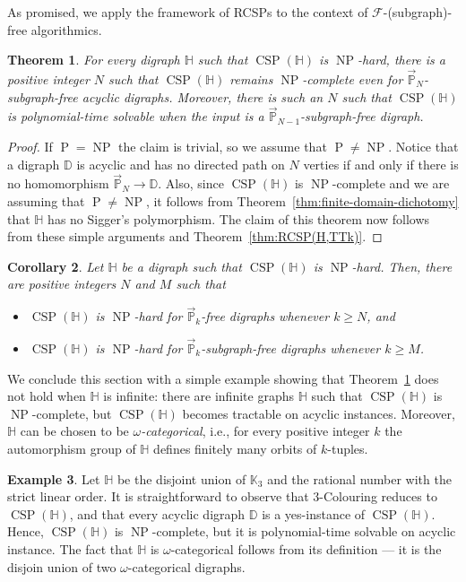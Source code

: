 \documentclass{article}
\newtheorem{theorem}{Theorem}
\newtheorem{corollary}[theorem]{Corollary}
\theoremstyle{definition}
\newtheorem{example}[theorem]{Example}
\theoremstyle{remark}
\DeclareMathOperator{\NP}{NP}
\DeclareMathOperator{\cP}{P}
\DeclareMathOperator{\CSP}{CSP}
\newcommand{\bD}{{\mathbb D}}
\newcommand{\bH}{{\mathbb H}}
\newcommand{\bK}{{\mathbb K}}
\newcommand{\bP}{{\mathbb P}}
\newcommand{\calF}{{\mathcal F}}
\newcommand{\COL}[1]{{\sc ${#1}$-Colouring}}
\begin{document}
As promised, we apply the framework of RCSPs to the context of $\calF$-(subgraph)-free
algorithmics.


\begin{theorem}\label{thm:acyclic+bounded-paths}
 For every digraph $\bH$ such that $\CSP(\bH)$ is $\NP$-hard, there is a positive integer
    $N$ such that $\CSP(\bH)$ remains $\NP$-complete even for $\vec{\bP}_N$-subgraph-free
    acyclic digraphs. Moreover, there is such an $N$ such that $\CSP(\bH)$ is polynomial-time
    solvable when the input is a $\vec{\bP}_{N-1}$-subgraph-free digraph.
\end{theorem}
\begin{proof}
    If $\cP = \NP$ the claim is trivial, so we assume that $\cP\neq \NP$. Notice that
    a digraph $\bD$ is acyclic and has no directed path on $N$ verties if and only if
    there is no homomorphism $\vec{\bP}_N\to \bD$. Also, since $\CSP(\bH)$ is $\NP$-complete
    and we are assuming that $\cP\neq \NP$, it follows from Theorem~\ref{thm:finite-domain-dichotomy}
    that $\bH$ has no Sigger's polymorphism. The claim of this theorem now follows from these
    simple arguments and Theorem~\ref{thm:RCSP(H,TTk)}.
\end{proof}

\begin{corollary}\label{thm:digraph-}
    Let $\bH$ be a digraph such that $\CSP(\bH)$ is $\NP$-hard. Then, there are positive
    integers $N$ and $M$ such that
    \begin{itemize}
        \item $\CSP(\bH)$ is $\NP$-hard for $\vec{\bP}_k$-free digraphs whenever $k\ge N$, and
        \item $\CSP(\bH)$ is $\NP$-hard for $\vec{\bP}_k$-subgraph-free digraphs whenever $k\ge M$.
    \end{itemize}
\end{corollary}

We conclude this section with a simple example showing that Theorem~\ref{thm:acyclic+bounded-paths}
does not hold when $\bH$ is infinite: there are infinite graphs $\bH$ such that 
$\CSP(\bH)$ is $\NP$-complete, but $\CSP(\bH)$ becomes tractable on acyclic instances.
Moreover, $\bH$ can be chosen to be \emph{$\omega$-categorical}, i.e., 
for every positive integer $k$ the automorphism group of $\bH$ defines finitely many orbits
of $k$-tuples.

\begin{example}\label{ex:infinite-acyclic}
    Let $\bH$ be the disjoint union of $\bK_3$ and the rational number with the strict linear order. 
    It is straightforward to observe that \COL{3} reduces to $\CSP(\bH)$, and that
    every acyclic digraph $\bD$ is a yes-instance of $\CSP(\bH)$. Hence, 
    $\CSP(\bH)$ is $\NP$-complete, but it is polynomial-time solvable on acyclic instance.
    The fact that $\bH$ is $\omega$-categorical follows from its definition --- it is the
    disjoin union of two $\omega$-categorical digraphs.
\end{example}
\end{document}
